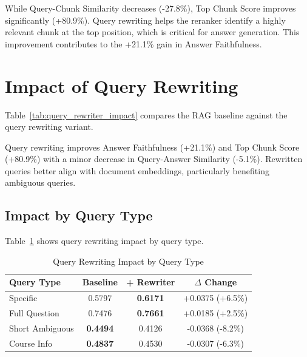 While Query-Chunk Similarity decreases (-27.8\%), Top Chunk Score improves significantly (+80.9\%). Query rewriting helps the reranker identify a highly relevant chunk at the top position, which is critical for answer generation. This improvement contributes to the +21.1\% gain in Answer Faithfulness.

\section{Impact of Query Rewriting}

Table~\ref{tab:query_rewriter_impact} compares the RAG baseline against the query rewriting variant.

\begin{table}[htbp]
\centering
\caption{Impact of Query Rewriting on Answer Quality}
\label{tab:query_rewriter_impact}
\end{table}

Query rewriting improves Answer Faithfulness (+21.1\%) and Top Chunk Score (+80.9\%) with a minor decrease in Query-Answer Similarity (-5.1\%). Rewritten queries better align with document embeddings, particularly benefiting ambiguous queries.

\subsection{Impact by Query Type}

Table~\ref{tab:query_type_impact} shows query rewriting impact by query type.

\begin{table}[htbp]
\centering
\caption{Query Rewriting Impact by Query Type}
\label{tab:query_type_impact}
\begin{tabular}{|l|c|c|c|}
\hline
\textbf{Query Type} & \textbf{Baseline} & \textbf{+ Rewriter} & \textbf{\ensuremath{\Delta} Change} \\
\hline
Specific & 0.5797 & \textbf{0.6171} & +0.0375 (+6.5\%) \\
\hline
Full Question & 0.7476 & \textbf{0.7661} & +0.0185 (+2.5\%) \\
\hline
Short Ambiguous & \textbf{0.4494} & 0.4126 & -0.0368 (-8.2\%) \\
\hline
Course Info & \textbf{0.4837} & 0.4530 & -0.0307 (-6.3\%) \\
\hline
\end{tabular}
\end{table}

